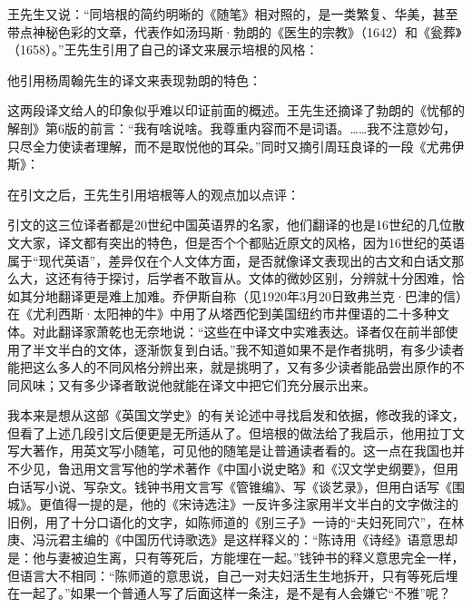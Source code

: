 \par 王先生又说：“同培根的简约明晰的《随笔》相对照的，是一类繁复、华美，甚至带点神秘色彩的文章，代表作如汤玛斯·勃朗的《医生的宗教》（1642）和《瓮葬》（1658）。”王先生引用了自己的译文来展示培根的风格：
\par 他引用杨周翰先生的译文来表现勃朗的特色：
\par 这两段译文给人的印象似乎难以印证前面的概述。王先生还摘译了勃朗的《忧郁的解剖》第6版的前言：“我有啥说啥。我尊重内容而不是词语。……我不注意妙句，只尽全力使读者理解，而不是取悦他的耳朵。”同时又摘引周珏良译的一段《尤弗伊斯》：
\par 在引文之后，王先生引用培根等人的观点加以点评：
\par 引文的这三位译者都是20世纪中国英语界的名家，他们翻译的也是16世纪的几位散文大家，译文都有突出的特色，但是否个个都贴近原文的风格，因为16世纪的英语属于“现代英语”，差异仅在个人文体方面，是否就像译文表现出的古文和白话文那么大，这还有待于探讨，后学者不敢盲从。文体的微妙区别，分辨就十分困难，恰如其分地翻译更是难上加难。乔伊斯自称（见1920年3月20日致弗兰克·巴津的信）在《尤利西斯·太阳神的牛》中用了从塔西佗到美国纽约市井俚语的二十多种文体。对此翻译家萧乾也无奈地说：“这些在中译文中实难表达。译者仅在前半部使用了半文半白的文体，逐渐恢复到白话。”我不知道如果不是作者挑明，有多少读者能把这么多人的不同风格分辨出来，就是挑明了，又有多少读者能品尝出原作的不同风味；又有多少译者敢说他就能在译文中把它们充分展示出来。
\par 我本来是想从这部《英国文学史》的有关论述中寻找启发和依据，修改我的译文，但看了上述几段引文后便更是无所适从了。但培根的做法给了我启示，他用拉丁文写大著作，用英文写小随笔，可见他的随笔是让普通读者看的。这一点在我国也并不少见，鲁迅用文言写他的学术著作《中国小说史略》和《汉文学史纲要》，但用白话写小说、写杂文。钱钟书用文言写《管锥编》、写《谈艺录》，但用白话写《围城》。更值得一提的是，他的《宋诗选注》一反许多注家用半文半白的文字做注的旧例，用了十分口语化的文字，如陈师道的《别三子》一诗的“夫妇死同穴”，在林庚、冯沅君主编的《中国历代诗歌选》是这样释义的：“陈诗用《诗经》语意思却是：他与妻被迫生离，只有等死后，方能埋在一起。”钱钟书的释义意思完全一样，但语言大不相同：“陈师道的意思说，自己一对夫妇活生生地拆开，只有等死后埋在一起了。”如果一个普通人写了后面这样一条注，是不是有人会嫌它“不雅”呢？

